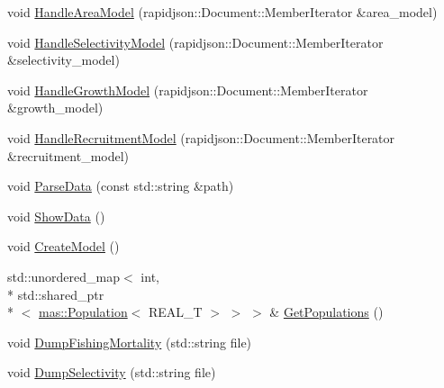 \begin{DoxyCompactItemize}
\item 
void \hyperlink{classmas_1_1_information_a0a3b16dccc3c1e9c83791f9ee499e345}{Handle\-Area\-Model} (rapidjson\-::\-Document\-::\-Member\-Iterator \&area\-\_\-model)
\item 
void \hyperlink{classmas_1_1_information_a8b90279ef4aee66ac9d983f337350ffc}{Handle\-Selectivity\-Model} (rapidjson\-::\-Document\-::\-Member\-Iterator \&selectivity\-\_\-model)
\item 
void \hyperlink{classmas_1_1_information_a01ef7a80bb30104b29e2a02f8a68585b}{Handle\-Growth\-Model} (rapidjson\-::\-Document\-::\-Member\-Iterator \&growth\-\_\-model)
\item 
void \hyperlink{classmas_1_1_information_a7a1ada30329d94513bd1fe4da9f5eada}{Handle\-Recruitment\-Model} (rapidjson\-::\-Document\-::\-Member\-Iterator \&recruitment\-\_\-model)
\item 
void \hyperlink{classmas_1_1_information_aa9231a08baef815e554c9409721db949}{Parse\-Data} (const std\-::string \&path)
\item 
void \hyperlink{classmas_1_1_information_a4acd2cd593e38ff9811a8b82f8d80b9f}{Show\-Data} ()
\item 
void \hyperlink{classmas_1_1_information_aedf136f9e26677da4001be0246416ec9}{Create\-Model} ()
\item 
std\-::unordered\-\_\-map$<$ int, \\*
std\-::shared\-\_\-ptr\\*
$<$ \hyperlink{classmas_1_1_population}{mas\-::\-Population}$<$ R\-E\-A\-L\-\_\-\-T $>$ $>$ $>$ \& \hyperlink{classmas_1_1_information_a2f8b99cfb05913e795d8039fee851867}{Get\-Populations} ()
\item 
void \hyperlink{classmas_1_1_information_a5d48355043bf563672afdb6d2881eba6}{Dump\-Fishing\-Mortality} (std\-::string file)
\item 
void \hyperlink{classmas_1_1_information_a4507090a348f2fa3b5a1cb3a53138004}{Dump\-Selectivity} (std\-::string file)
\end{DoxyCompactItemize}
